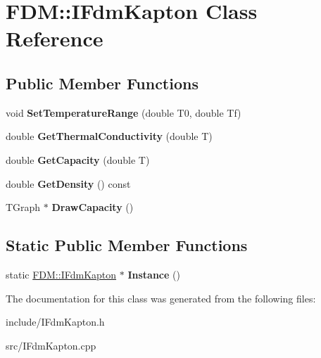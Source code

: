 \hypertarget{class_f_d_m_1_1_i_fdm_kapton}{}\section{F\+D\+M\+:\+:I\+Fdm\+Kapton Class Reference}
\label{class_f_d_m_1_1_i_fdm_kapton}
\subsection*{Public Member Functions}
\begin{DoxyCompactItemize}
\item 
\hypertarget{class_f_d_m_1_1_i_fdm_kapton_a3e418f7d564ac1dd1f4df524881fcb0d}{}void {\bfseries Set\+Temperature\+Range} (double T0, double Tf)\label{class_f_d_m_1_1_i_fdm_kapton_a3e418f7d564ac1dd1f4df524881fcb0d}

\item 
\hypertarget{class_f_d_m_1_1_i_fdm_kapton_a2fa6834eb23e20611e915a91acad1aed}{}double {\bfseries Get\+Thermal\+Conductivity} (double T)\label{class_f_d_m_1_1_i_fdm_kapton_a2fa6834eb23e20611e915a91acad1aed}

\item 
\hypertarget{class_f_d_m_1_1_i_fdm_kapton_a7397d0e380d5a0fd07e475c923fe9257}{}double {\bfseries Get\+Capacity} (double T)\label{class_f_d_m_1_1_i_fdm_kapton_a7397d0e380d5a0fd07e475c923fe9257}

\item 
\hypertarget{class_f_d_m_1_1_i_fdm_kapton_aaa4b98bb9336f9e774c7c8c29cdfaa66}{}double {\bfseries Get\+Density} () const \label{class_f_d_m_1_1_i_fdm_kapton_aaa4b98bb9336f9e774c7c8c29cdfaa66}

\item 
\hypertarget{class_f_d_m_1_1_i_fdm_kapton_a968d80f6f4073e12c56411ab3b67495b}{}T\+Graph $\ast$ {\bfseries Draw\+Capacity} ()\label{class_f_d_m_1_1_i_fdm_kapton_a968d80f6f4073e12c56411ab3b67495b}

\end{DoxyCompactItemize}
\subsection*{Static Public Member Functions}
\begin{DoxyCompactItemize}
\item 
\hypertarget{class_f_d_m_1_1_i_fdm_kapton_a30deeef281d0381f97278903165020cb}{}static \hyperlink{class_f_d_m_1_1_i_fdm_kapton}{F\+D\+M\+::\+I\+Fdm\+Kapton} $\ast$ {\bfseries Instance} ()\label{class_f_d_m_1_1_i_fdm_kapton_a30deeef281d0381f97278903165020cb}

\end{DoxyCompactItemize}


The documentation for this class was generated from the following files\+:\begin{DoxyCompactItemize}
\item 
include/I\+Fdm\+Kapton.\+h\item 
src/I\+Fdm\+Kapton.\+cpp\end{DoxyCompactItemize}
